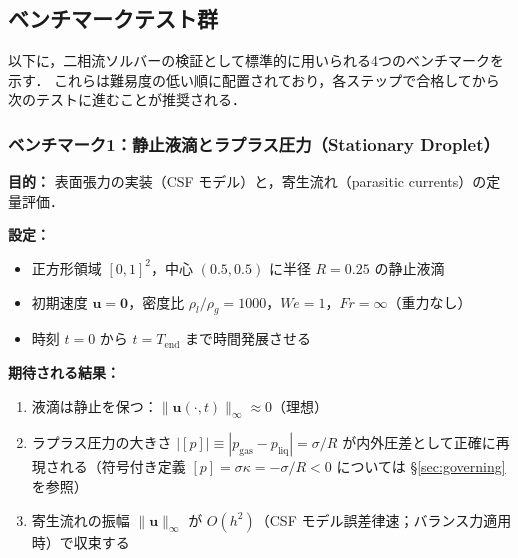 %
%
\subsection{ベンチマークテスト群}
\label{sec:benchmarks}

以下に，二相流ソルバーの検証として標準的に用いられる4つのベンチマークを示す．
これらは難易度の低い順に配置されており，各ステップで合格してから
次のテストに進むことが推奨される．

\subsubsection{ベンチマーク1：静止液滴とラプラス圧力（Stationary Droplet）}
\label{sec:bench_droplet}

\textbf{目的：} 表面張力の実装（CSF モデル）と，寄生流れ（parasitic currents）の定量評価．

\textbf{設定：}
\begin{itemize}
  \item 正方形領域 $[0,1]^2$，中心 $(0.5, 0.5)$ に半径 $R=0.25$ の静止液滴
  \item 初期速度 $\bm{u} = \bm{0}$，密度比 $\rho_l/\rho_g = 1000$，$We = 1$，$Fr = \infty$（重力なし）
  \item 時刻 $t = 0$ から $t = T_{\text{end}}$ まで時間発展させる
\end{itemize}

\textbf{期待される結果：}
\begin{enumerate}
  \item 液滴は静止を保つ：$\|\bm{u}(\cdot, t)\|_\infty \approx 0$（理想）
  \item ラプラス圧力の大きさ $|[p]| \equiv |p_\text{gas} - p_\text{liq}| = \sigma/R$ が内外圧差として正確に再現される（符号付き定義 $[p] = \sigma\kappa = -\sigma/R < 0$ については §\ref{sec:governing} を参照）
  \item 寄生流れの振幅 $\|\bm{u}\|_\infty$ が $O(h^2)$（CSF モデル誤差律速；バランス力適用時）で収束する
\end{enumerate}

